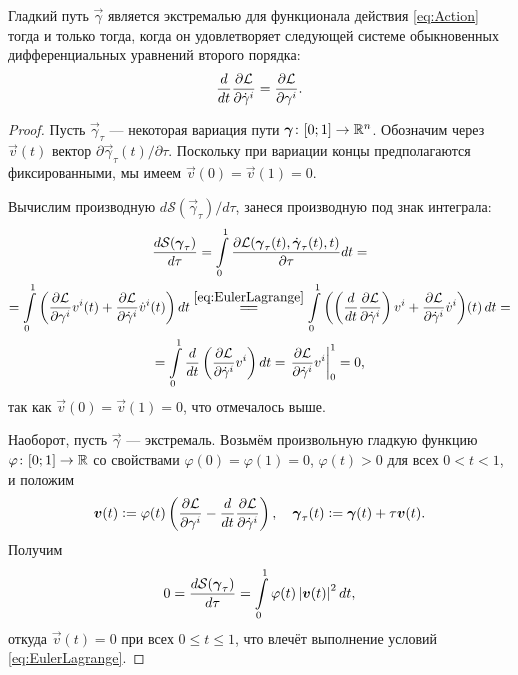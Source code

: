 \begin{lemma}
	Гладкий путь $\vec{\gamma}$ является экстремалью для функционала действия \eqref{eq:Action} тогда и только тогда, когда он удовлетворяет следующей системе обыкновенных дифференциальных уравнений второго порядка:
	\begin{equation} \label{eq:EulerLagrange}
		\frac{d}{dt}\frac{\partial\mathcal{L}}{\partial\dot{\gamma}^i} = \frac{\partial\mathcal{L}}{\partial\gamma^i}.
	\end{equation}
\end{lemma}

\begin{proof}
	Пусть $\vec{\gamma}_\tau$ --- некоторая вариация пути $\vec{\gamma}\colon [0; 1] \hm\to \R^n$. Обозначим через $\vec{v}(t)$ вектор $\partial\vec{\gamma}_\tau(t) / \partial\tau$. Поскольку при вариации концы предполагаются фиксированными, мы имеем $\vec{v}(0) = \vec{v}(1) = 0$.

	\noindent
	Вычислим производную $d\mathcal{S}(\vec{\gamma}_\tau) / d\tau$, занеся производную под знак интеграла:
	\begin{multline*}
		\frac{d\mathcal{S}(\vec{\gamma}_\tau)}{d\tau} = \int\limits_0^1\frac{\partial\L(\vec{\gamma}_\tau(t), \dot{\vec{\gamma}}_\tau(t), t)}{\partial\tau}dt =\\ = \int\limits_0^1\br{\frac{\partial\L}{\partial\gamma^i}v^i(t) + \frac{\partial\L}{\partial\dot{\gamma}^i}\dot{v}^i(t)}dt \stackrel{\eqref{eq:EulerLagrange}}{=\joinrel=} \int\limits_0^1\br{\br{\frac{d}{dt}\frac{\partial\L}{\partial\dot{\gamma}^i}}v^i + \frac{\partial\L}{\partial\dot{\gamma}^i}\dot{v}^i}\!(t)\,dt =\\ = \int\limits_0^1\frac{d}{dt}\br{\frac{\partial\L}{\partial\dot{\gamma}^i}v^i}dt = \left.\frac{\partial\L}{\partial\dot{\gamma}^i}v^i\right|_0^1 = 0,
	\end{multline*}
	так как $\vec{v}(0) = \vec{v}(1) = 0$, что отмечалось выше.

	Наоборот, пусть $\vec{\gamma}$ --- экстремаль. Возьмём произвольную гладкую функцию $\varphi\colon [0; 1] \to \mathbb{R}$ со свойствами $\varphi(0) = \varphi(1) = 0$, $\varphi(t) > 0$ для всех $0 < t < 1$, и положим
	\[
		\boldsymbol{v}(t) \vcentcolon = \varphi(t)\left(\frac{\partial\mathcal{L}}{\partial\gamma^i} - \frac{d}{dt}\frac{\partial\mathcal{L}}{\partial\dot{\gamma}^i}\right),\quad \boldsymbol{\gamma}_\tau(t) \vcentcolon = \boldsymbol{\gamma}(t) + \tau\boldsymbol{v}(t).
	\]
	Получим
	\[
		0 = \frac{d\mathcal{S}(\boldsymbol{\gamma}_\tau)}{d\tau} = \int\limits_0^1\varphi(t)\left\lvert\boldsymbol{v}(t)\right\rvert^2dt,
	\]
	откуда $\vec{v}(t) = 0$ при всех $0 \leqslant t \leqslant 1$, что влечёт выполнение условий \eqref{eq:EulerLagrange}.
\end{proof}

